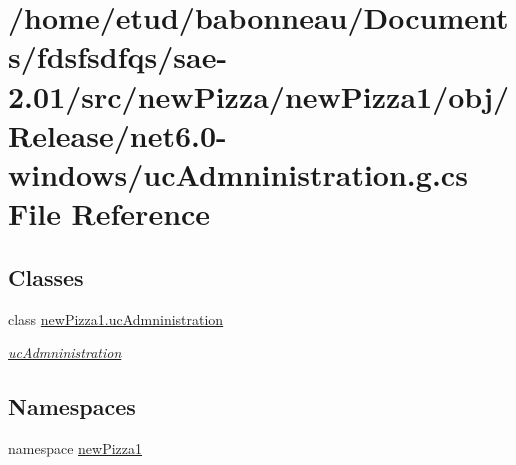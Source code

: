 \hypertarget{Release_2net6_80-windows_2ucAdmninistration_8g_8cs}{}\section{/home/etud/babonneau/\+Documents/fdsfsdfqs/sae-\/2.01/src/new\+Pizza/new\+Pizza1/obj/\+Release/net6.0-\/windows/uc\+Admninistration.g.\+cs File Reference}
\label{Release_2net6_80-windows_2ucAdmninistration_8g_8cs}
\subsection*{Classes}
\begin{DoxyCompactItemize}
\item 
class \hyperlink{classnewPizza1_1_1ucAdmninistration}{new\+Pizza1.\+uc\+Admninistration}
\begin{DoxyCompactList}\small\item\em \hyperlink{classnewPizza1_1_1ucAdmninistration}{uc\+Admninistration} \end{DoxyCompactList}\end{DoxyCompactItemize}
\subsection*{Namespaces}
\begin{DoxyCompactItemize}
\item 
namespace \hyperlink{namespacenewPizza1}{new\+Pizza1}
\end{DoxyCompactItemize}
